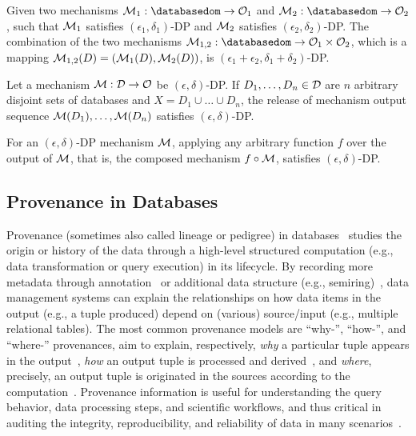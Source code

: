 \begin{theorem}
\label{thm:dp_seq_composition}
Given two mechanisms $\mc{M}_1: \databasedom \rightarrow  \mc{O}_1$ and $\mc{M}_2: \databasedom \rightarrow  \mc{O}_2$, such that $\mathcal{M}_1$ satisfies $(\epsilon_1, \delta_1)$-DP and $\mathcal{M}_2$ satisfies $(\epsilon_2, \delta_2)$-DP.
The combination of the two mechanisms $\mc{M}_{1, 2}: \databasedom \rightarrow  \mc{O}_1 \times \mc{O}_2$, which is a mapping $\mathcal{M}_{1, 2}(D) = (\mathcal{M}_1(D), \mathcal{M}_2(D))$, is $(\epsilon_1+\epsilon_2,\delta_1+\delta_2)$-DP.
\end{theorem}

\begin{theorem}
    Let a mechanism $\mathcal{M}: \mathcal{D} \rightarrow \mathcal{O}$ be $(\epsilon,\delta)$-DP. If $D_1, \dots, D_n \in \mathcal{D}$ are $n$ arbitrary disjoint sets of databases and $X = D_1 \cup \dots \cup D_n$, the release of mechanism output sequence $\mathcal{M}(D_1), \dots, \mathcal{M}(D_n)$ satisfies $(\epsilon,\delta)$-DP. 
\end{theorem}

\begin{theorem}
\label{thm:dp_post_processing}
For an $(\epsilon, \delta)$-DP mechanism $\mathcal{M}$, applying any arbitrary function $f$ over the output of $\mathcal{M}$, that is, the composed mechanism $f \circ \mathcal{M}$, satisfies $(\epsilon, \delta)$-DP.
\end{theorem}

\subsection{Provenance in Databases}

Provenance (sometimes also called lineage or pedigree) in databases~\cite{cheney2009provenance} studies the origin or history of the data through a high-level structured computation (e.g., data transformation or query execution) in its lifecycle. By recording more metadata through annotation~\cite{BunemanKT02annotations} or additional data structure (e.g., semiring)~\cite{GreenKT07provenance_semiring,GreenT17provenance_semiring}, data management systems can explain the relationships on how data items in the output (e.g., a tuple produced) depend on (various) source/input (e.g., multiple relational tables).
The most common provenance models are ``why-'', ``how-'', and ``where-'' provenances, aim to explain, respectively, \emph{why} a particular tuple appears in the output~\cite{BunemanKT01where-prov}, \emph{how} an output tuple is processed and derived~\cite{GreenKT07provenance_semiring}, and \emph{where}, precisely, an output tuple is originated in the sources according to the computation~\cite{BunemanKT01where-prov}.
Provenance information is useful for understanding the query behavior, data processing steps, and scientific workflows, and thus critical in auditing the integrity, reproducibility, and reliability of data in many scenarios~\cite{cheney2009provenance}.

